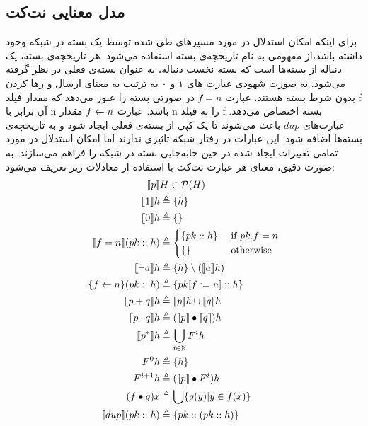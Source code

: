 \subsection{مدل معنایی نت‌کت}
برای اینکه امکان استدلال در مورد مسیر‌های طی شده توسط یک بسته‌ در شبکه وجود داشته باشد،از مفهومی به نام تاریخچه‌ی بسته%
استفاده می‌شود.
هر تاریخچه‌ی بسته‌، یک دنباله از بسته‌ها است که بسته نخست دنباله، به عنوان بسته‌ی فعلی در نظر گرفته می‌شود.
به صورت شهودی
عبارت های ۱ و ۰ به ترتیب به معنای ارسال%
و رها کردن%
بدون شرط بسته هستند.
عبارت
$f=n$
در صورتی بسته را عبور می‌دهد که مقدار فیلد
f
آن برابر با
n
باشد.
عبارت
$f \leftarrow n$
مقدار n
را به فیلد f
بسته اختصاص
می‌دهد.
عبارت‌های
$dup$
باعث می‌شوند تا یک کپی از بسته‌ی فعلی ایجاد شود و به تاریخچه‌ی بسته‌ها اضافه شود.
این عبارات در رفتار شبکه تاثیری ندارند اما امکان استدلال در مورد تمامی تغییرات ایجاد شده در حین جا‌به‌جایی بسته در شبکه را فراهم می‌سازند.
به صورت دقیق، معنای هر عبارت%
نت‌کت با استفاده از معادلات زیر تعریف می‌شود:
\begin{align}
    \llbracket p \rrbracket             & H \in \mathcal{P}({H}) \label{eq:netkat:sem}                  \\
    \llbracket 1 \rrbracket h           & \triangleq \{h\}     \label{eq:netkat:identity}                     \\
    \llbracket 0 \rrbracket h           & \triangleq \{\}          \label{eq:netkat:drop}                     \\
    \llbracket f=n \rrbracket(pk::h)    & \triangleq \begin{cases}
                                   \{pk::h\} & \text{ if } pk.f = n \\
                                   \{\}      & \text{ otherwise }
                               \end{cases}    \label{eq:netkat:filter}                  \\
    \llbracket \neg a \rrbracket h       & \triangleq \{h\} \setminus (\llbracket a \rrbracket h) \label{eq:netkat:nfilter}     \\
    \{f \leftarrow n\} (pk::h) & \triangleq \{pk[f:=n]::h\}     \label{eq:netkat:assign}             \\
    \llbracket p+q \rrbracket h          & \triangleq \llbracket p \rrbracket h \cup \llbracket q \rrbracket h   \label{eq:netkat:sum}           \\
    \llbracket p\cdot q \rrbracket h    & \triangleq (\llbracket p \rrbracket \bullet \llbracket q \rrbracket) h    \label{eq:netkat:dot}     \\
    \llbracket p^* \rrbracket h          & \triangleq \bigcup_{i \in \mathbb{N}}F^i h \label{eq:netkat:kleene} \\
    F^0 h               & \triangleq \{h\}                                                    \\
    F^{i+1} h           & \triangleq (\llbracket p \rrbracket \bullet F^i) h                                  \\
    (f \bullet g) x     & \triangleq \bigcup\{g(y)|y \in f(x)\}                               \\
    \llbracket dup \rrbracket (pk::h)   & \triangleq \{pk::(pk::h)\} \label{eq:netkat:dup}
\end{align}

